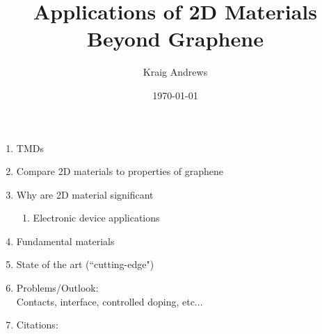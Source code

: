 \documentclass{article}
\author{Kraig Andrews}
\title{Applications of 2D Materials Beyond Graphene}
\date{\today}
\begin{document}
\maketitle

\begin{enumerate} %
	\item{TMDs}

	\item{Compare 2D materials to properties of graphene}

	\item{Why are 2D material significant}
	\begin{enumerate} %
		\item{Electronic device applications}
	\end{enumerate} %

	\item{Fundamental materials}

	\item{State of the art (``cutting-edge")}

	\item{Problems/Outlook:\\
		Contacts, interface, controlled doping, etc...}

	\item{Citations: \cite{2DflexibleNanoElectronics2014, nanoscaleReview2011,acsnanoReview2013, singleLayerMoS2electronics2015, vanderWaalsHeterostruct2013, electronicsAndOptoelectronics2012}}

\end{enumerate} %



\end{document}
